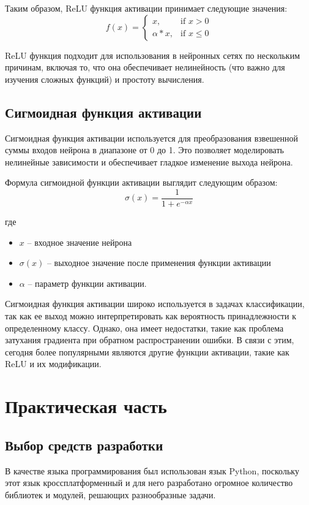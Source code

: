 \documentclass[12pt]{report}
\begin{document}
Таким образом, ReLU функция активации принимает следующие значения:
\begin{equation}
    f(x) = \begin{cases} 
    x, & \mbox{if } x > 0 \\ 
    \alpha * x, & \mbox{if } x \leq 0 
    \end{cases} 
\end{equation}

ReLU функция  подходит для использования в нейронных сетях по нескольким причинам, включая то, что она обеспечивает нелинейность (что важно для изучения сложных функций) и простоту вычисления.

\section{Сигмоидная функция активации}
Сигмоидная функция активации используется для преобразования взвешенной суммы входов нейрона в диапазоне от 0 до 1. Это позволяет моделировать нелинейные зависимости и обеспечивает гладкое изменение выхода нейрона.

Формула сигмоидной функции активации выглядит следующим образом:
\begin{equation}
     \sigma(x) = \frac{1}{1 + e^{-\alpha x}}
\end{equation}
   
где 
\begin{itemize}
    \item $x$ -- входное значение нейрона
    \item $\sigma(x)$ -- выходное значение после применения функции активации
    \item $\alpha$ -- параметр функции активации.
\end{itemize}

Сигмоидная функция активации широко используется в задачах классификации, так как ее выход можно интерпретировать как вероятность принадлежности к определенному классу. Однако, она имеет недостатки, такие как проблема затухания градиента при обратном распространении ошибки. В связи с этим, сегодня более популярными являются другие функции активации, такие как ReLU и их модификации.

\chapter{Практическая часть}

\section{Выбор средств разработки}
В качестве языка программирования был использован язык Python, поскольку этот язык кроссплатформенный и для него разработано огромное количество библиотек и модулей, решающих разнообразные задачи. 
\end{document}
